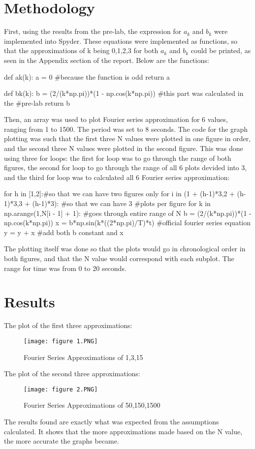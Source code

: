 \documentclass[12pt]{article}
\begin{document}
\section{Methodology}
First, using the results from the pre-lab, the expression for $a_k$ and $b_k$ were implemented into Spyder. These equations were implemented as functions, so that the approximations of k being 0,1,2,3 for both $a_k$ and $b_k$ could be printed, as seen in the Appendix section of the report. Below are the functions:
\begin{python}
def ak(k):
    a = 0 #because the function is odd
    return a

def bk(k):
    b = (2/(k*np.pi))*(1 - np.cos(k*np.pi)) #this part was calculated in the
    #pre-lab
    return b
\end{python}
Then, an array was used to plot Fourier series approximation for 6 values, ranging from 1 to 1500. The period was set to 8 seconds. The code for the graph plotting was such that the first three N values were plotted in one figure in order, and the second three N values were plotted in the second figure.\newline
This was done using three for loops: the first for loop was to go through the range of both figures, the second for loop to go through the range of all 6 plots devided into 3, and the third for loop was to calculated all 6 Fourier series approximation:
\begin{python}
for h in [1,2]:#so that we can have two figures only
    for i in (1 + (h-1)*3,2 + (h-1)*3,3 + (h-1)*3): #so that we can have 3 
        #plots per figure
        for k in np.arange(1,N[i - 1] + 1): #goes through entire range of N
            b = (2/(k*np.pi))*(1 - np.cos(k*np.pi))
            x = b*np.sin(k*((2*np.pi)/T)*t) #official fourier series equation
            y = y + x #add both b constant and x
\end{python}
The plotting itself was done so that the plots would go in chronological order in both figures, and that the N value would correspond with each subplot. The range for time was from 0 to 20 seconds.

\section{Results}
The plot of the first three approximations:
\begin{figure}[H]
\texttt{[image: figure 1.PNG]}
  \caption{Fourier Series Approximations of 1,3,15}
  \end{figure}
The plot of the second three approximations:
\begin{figure}[H]
\texttt{[image: figure 2.PNG]} 
  \caption{Fourier Series Approximations of 50,150,1500}
  \end{figure}
The results found are exactly what was expected from the assumptions calculated. It shows that the more approximations made based on the N value, the more accurate the graphs became.
\end{document}
